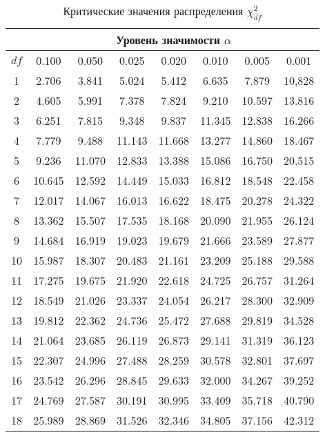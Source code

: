 \documentclass[12pt]{article}
\begin{document}
\begin{table}
\caption{Критические значения распределения $\chi^2_{df}$} %
\begin{center}
{\small
\begin{tabular}{|c|c|c|c|c|c|c|c|}
	\hline
	& \multicolumn{7}{c|}{Уровень значимости $\alpha$} \\ \hline
	$df$   & 0.100 &  0.050 &  0.025 &  0.020 &  0.010 &   0.005 &  0.001 \\ \hline \hline
	1  & 2.706 &  3.841 &  5.024 &  5.412 &  6.635 &  7.879 &  10,828 \\
	2  & 4.605 &  5.991 &  7.378 &  7.824 &  9.210 &  10.597 & 13.816 \\
	3 &  6.251 &   7.815 &  9.348 &  9.837 &  11.345 & 12.838 & 16.266 \\
	4 &  7.779 &  9.488 &  11.143 & 11.668 & 13.277 & 14.860 & 18.467 \\
	5 &  9.236 &  11.070 & 12.833 & 13.388 & 15.086 & 16.750 & 20.515 \\
	6 &  10.645 & 12.592 & 14.449 & 15.033 & 16.812 & 18.548 & 22.458 \\
	7 &  12.017 & 14.067 & 16.013 & 16.622 & 18.475 & 20.278 & 24.322 \\
	8 &  13.362 & 15.507 & 17.535 & 18.168 & 20.090 & 21.955 & 26.124 \\
	9 &  14.684 & 16.919 & 19.023 & 19.679 & 21.666 & 23.589 & 27.877 \\
	10 & 15.987 & 18.307 & 20.483 & 21.161 & 23.209 & 25.188 & 29.588 \\
	11 &  17.275 &  19.675 & 21.920 & 22.618 & 24.725 & 26.757 & 31.264\\
	12 & 18.549 & 21.026 & 23.337 & 24.054 & 26.217 & 28.300 & 32.909 \\
	13 & 19.812 & 22.362 & 24.736 & 25.472 & 27.688 & 29.819 & 34.528 \\
	14 & 21.064 & 23.685 & 26.119 & 26.873 & 29.141 & 31.319 & 36.123 \\
	15 & 22.307 & 24.996 & 27.488 & 28.259 & 30.578 & 32.801 & 37.697 \\
	16 &  23.542 & 26.296 & 28.845 & 29.633 & 32.000 & 34.267 & 39.252\\
	17 & 24.769 & 27.587 & 30.191 & 30.995 & 33.409 & 35.718 & 40.790\\
	18 & 25.989 & 28.869 & 31.526 & 32.346 & 34.805 & 37.156 & 42.312\\

\end{tabular}}
\end{center}
\end{table}
\end{document}
